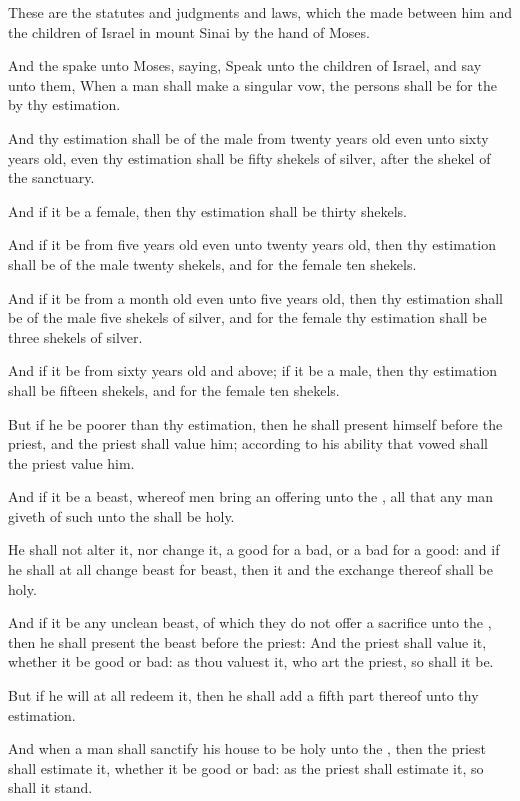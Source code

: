 \Verse These are the statutes and judgments and laws, which the \LORD made between him and the children of Israel in mount Sinai by the hand of Moses.

\Chapter
\Verse And the \LORD spake unto Moses, saying, \Verse Speak unto the children of Israel, and say unto them, When a man shall make a singular vow, the persons shall be for the \LORD by thy estimation.

\Verse And thy estimation shall be of the male from twenty years old even unto sixty years old, even thy estimation shall be fifty shekels of silver, after the shekel of the sanctuary.

\Verse And if it be a female, then thy estimation shall be thirty shekels.

\Verse And if it be from five years old even unto twenty years old, then thy estimation shall be of the male twenty shekels, and for the female ten shekels.

\Verse And if it be from a month old even unto five years old, then thy estimation shall be of the male five shekels of silver, and for the female thy estimation shall be three shekels of silver.

\Verse And if it be from sixty years old and above; if it be a male, then thy estimation shall be fifteen shekels, and for the female ten shekels.

\Verse But if he be poorer than thy estimation, then he shall present himself before the priest, and the priest shall value him; according to his ability that vowed shall the priest value him.

\Verse And if it be a beast, whereof men bring an offering unto the \LORD, all that any man giveth of such unto the \LORD shall be holy.

\Verse He shall not alter it, nor change it, a good for a bad, or a bad for a good: and if he shall at all change beast for beast, then it and the exchange thereof shall be holy.

\Verse And if it be any unclean beast, of which they do not offer a sacrifice unto the \LORD, then he shall present the beast before the priest: \Verse And the priest shall value it, whether it be good or bad: as thou valuest it, who art the priest, so shall it be.

\Verse But if he will at all redeem it, then he shall add a fifth part thereof unto thy estimation.

\Verse And when a man shall sanctify his house to be holy unto the \LORD, then the priest shall estimate it, whether it be good or bad: as the priest shall estimate it, so shall it stand.

